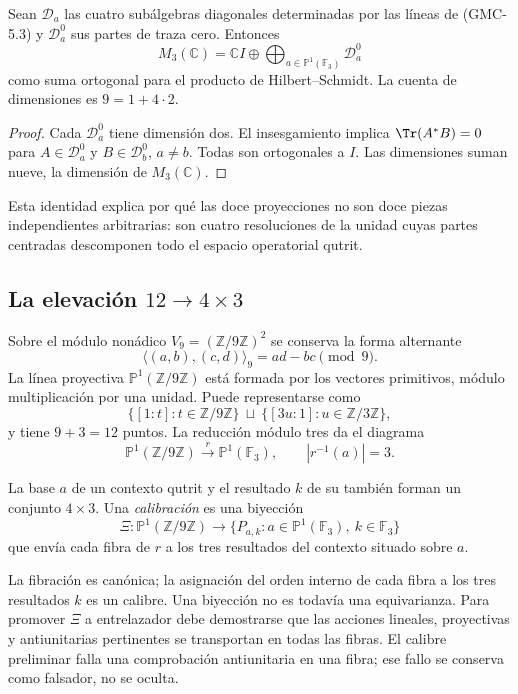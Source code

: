 \begin{proposition}
\label{p12-83-c2-s4:gmc:prop:descomposicion-masa-qutrit}
Sean $\mathcal D_a$ las cuatro subálgebras diagonales determinadas por las
líneas de \textup{(GMC-5.3)} y $\mathcal D_a^0$ sus partes de traza cero. Entonces
\[
 M_3(\mathbb C)
 =\mathbb CI\oplus
   \bigoplus_{a\in\mathbb P^1(\mathbb F_3)}\mathcal D_a^0
 \tag{GMC-5.4}
\]
como suma ortogonal para el producto de Hilbert--Schmidt. La cuenta de
dimensiones es $9=1+4\cdot2$.
\end{proposition}

\begin{proof}
Cada $\mathcal D_a^0$ tiene dimensión dos. El insesgamiento implica
$\Tr(A^*B)=0$ para $A\in\mathcal D_a^0$ y
$B\in\mathcal D_b^0$, $a\ne b$. Todas son ortogonales a $I$. Las
dimensiones suman nueve, la dimensión de $M_3(\mathbb C)$.
\end{proof}

Esta identidad explica por qué las doce proyecciones no son doce piezas
independientes arbitrarias: son cuatro resoluciones de la unidad cuyas partes
centradas descomponen todo el espacio operatorial qutrit.

\subsection{La elevación \texorpdfstring{$12\to4\times3$}{12 a 4 por 3}}

Sobre el módulo nonádico $V_9=(\mathbb Z/9\mathbb Z)^2$ se conserva la forma
alternante
\[
 \langle(a,b),(c,d)\rangle_9=ad-bc\pmod9.
 \tag{GMC-5.5}
\]
La línea proyectiva $\mathbb P^1(\mathbb Z/9\mathbb Z)$ está formada por
los vectores primitivos, módulo multiplicación por una unidad. Puede
representarse como
\[
 \{[1:t]:t\in\mathbb Z/9\mathbb Z\}
 \ \sqcup\ 
 \{[3u:1]:u\in\mathbb Z/3\mathbb Z\},
 \tag{GMC-5.6}
\]
y tiene $9+3=12$ puntos. La reducción módulo tres da el diagrama
\[
 \mathbb P^1(\mathbb Z/9\mathbb Z)
 \xrightarrow{\ r\ }
 \mathbb P^1(\mathbb F_3),
 \qquad |r^{-1}(a)|=3.
 \tag{GMC-5.7}
\]

La base $a$ de un contexto qutrit y el resultado $k$ de su \PVM también
forman un conjunto $4\times3$. Una \emph{calibración} es una biyección
\[
 \Xi:\mathbb P^1(\mathbb Z/9\mathbb Z)
 \longrightarrow
 \{P_{a,k}:a\in\mathbb P^1(\mathbb F_3),\ k\in\mathbb F_3\}
 \tag{GMC-5.8}
\]
que envía cada fibra de $r$ a los tres resultados del contexto situado sobre
$a$.

\begin{controlbox}
La fibración es canónica; la asignación del orden interno de cada fibra a los
tres resultados $k$ es un calibre. Una biyección no es todavía una
equivarianza. Para promover $\Xi$ a entrelazador debe demostrarse que las
acciones lineales, proyectivas y antiunitarias pertinentes se transportan en
todas las fibras. El calibre preliminar falla una comprobación antiunitaria en una
fibra; ese fallo se conserva como falsador, no se oculta.
\end{controlbox}

